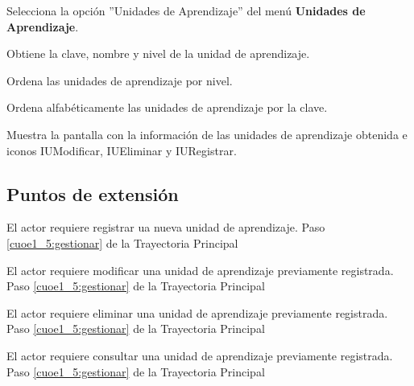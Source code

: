 \begin{UCtrayectoria}
	
	\UCpaso [\UCactor] Selecciona la opción ''Unidades de Aprendizaje'' del menú \textbf{Unidades de Aprendizaje}. %
	
	\UCpaso [\UCsist] Obtiene la clave, nombre y nivel de la unidad de aprendizaje.
	
	\UCpaso [\UCsist] Ordena las unidades de aprendizaje por nivel.
	
	\UCpaso [\UCsist] Ordena alfabéticamente las unidades de aprendizaje por la clave.
	
	\UCpaso[\UCsist] Muestra la pantalla  con la información de las unidades de aprendizaje obtenida e iconos IUModificar, IUEliminar y IURegistrar. 
	\label{cuoe1_5:gestionar}
\end{UCtrayectoria}

\subsection{Puntos de extensión}

\UCExtensionPoint 
{El actor requiere registrar ua nueva unidad de aprendizaje.}
{Paso \ref{cuoe1_5:gestionar} de la Trayectoria Principal}
{}

\UCExtensionPoint 
{El actor requiere modificar una unidad de aprendizaje previamente registrada.}
{Paso \ref{cuoe1_5:gestionar} de la Trayectoria Principal}
{}

\UCExtensionPoint 
{El actor requiere eliminar una unidad de aprendizaje previamente registrada.}
{Paso \ref{cuoe1_5:gestionar} de la Trayectoria Principal}
{}

\UCExtensionPoint 
{El actor requiere consultar una unidad de aprendizaje previamente registrada.}
{Paso \ref{cuoe1_5:gestionar} de la Trayectoria Principal}
{}


